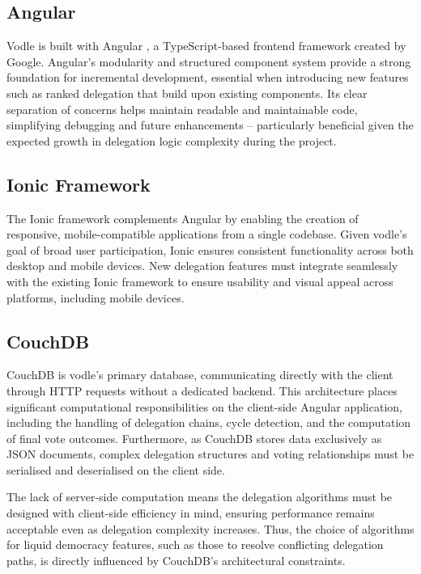 \subsection*{Angular}
Vodle is built with Angular \citep{angular}, a TypeScript-based frontend framework created by Google. Angular's modularity and structured component system provide a strong foundation for incremental development, essential when introducing new features such as ranked delegation that build upon existing components. Its clear separation of concerns helps maintain readable and maintainable code, simplifying debugging and future enhancements -- particularly beneficial given the expected growth in delegation logic complexity during the project.

\subsection*{Ionic Framework}
The Ionic \citep{ionic} framework complements Angular by enabling the creation of responsive, mobile-compatible applications from a single codebase. Given vodle's goal of broad user participation, Ionic ensures consistent functionality across both desktop and mobile devices. %
New delegation features must integrate seamlessly with the existing Ionic framework to ensure usability and visual appeal across platforms, including mobile devices.

\subsection*{CouchDB}
CouchDB \citep{couchdb} is vodle's primary database, communicating directly with the client through HTTP requests without a dedicated backend. This architecture places significant computational responsibilities on the client-side Angular application, including the handling of delegation chains, cycle detection, and the computation of final vote outcomes. Furthermore, as CouchDB stores data exclusively as JSON documents, complex delegation structures and voting relationships must be serialised and deserialised on the client side.

The lack of server-side computation means the delegation algorithms must be designed with client-side efficiency in mind, ensuring performance remains acceptable even as delegation complexity increases. Thus, the choice of algorithms for liquid democracy features, such as those to resolve conflicting delegation paths, is directly influenced by CouchDB's architectural constraints.

